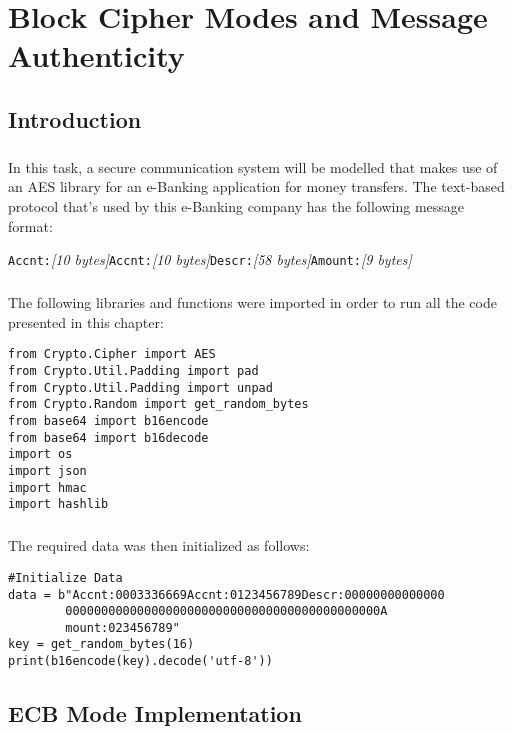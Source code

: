 \chapter{Block Cipher Modes and Message Authenticity}

\section{Introduction}
\paragraph{ }In this task, a secure communication system will be modelled that makes use of an AES library for an e-Banking application for money transfers. The text-based protocol that's used by this e-Banking company has the following message format:

\par\centerline{\texttt{Accnt:}\textit{[10 bytes]}\texttt{Accnt:}\textit{[10 bytes]}\texttt{Descr:}\textit{[58 bytes]}\texttt{Amount:}\textit{[9 bytes]}}

\paragraph{ }The following libraries and functions were imported in order to run all the code presented in this chapter:

\begin{lstlisting}
from Crypto.Cipher import AES
from Crypto.Util.Padding import pad
from Crypto.Util.Padding import unpad
from Crypto.Random import get_random_bytes
from base64 import b16encode
from base64 import b16decode
import os
import json
import hmac
import hashlib
\end{lstlisting}

\paragraph{ }The required data was then initialized as follows:

\begin{lstlisting}
#Initialize Data
data = b"Accnt:0003336669Accnt:0123456789Descr:00000000000000
		00000000000000000000000000000000000000000000A
		mount:023456789"
key = get_random_bytes(16)
print(b16encode(key).decode('utf-8'))
\end{lstlisting}


\section{ECB Mode Implementation}
